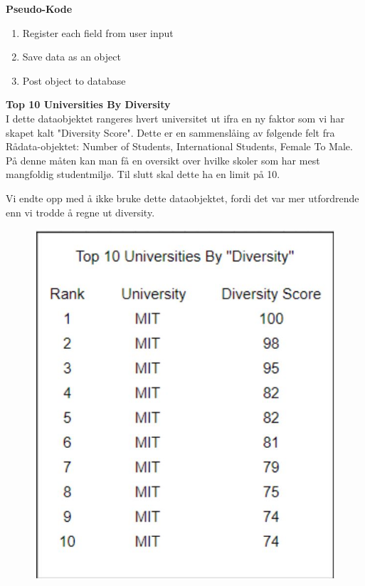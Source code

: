 \textbf{Pseudo-Kode}
\begin{enumerate}
  \item Register each field from user input
  \item Save data as an object
  \item Post object to database
\end{enumerate}

\textbf{Top 10 Universities By Diversity}\\
I dette dataobjektet rangeres hvert universitet ut ifra en ny faktor som vi har skapet kalt "Diversity Score". Dette er en sammenslåing av følgende felt fra Rådata-objektet: Number of Students, International Students, Female To Male. På denne måten kan man få en oversikt over hvilke skoler som har mest mangfoldig studentmiljø. Til slutt skal dette ha en limit på 10.

Vi endte opp med å ikke bruke dette dataobjektet, fordi det var mer utfordrende enn vi trodde å regne ut diversity.

\FigureCounter
\begin{figure}[H]
  \includegraphics[scale=0.5]{images/milepael4/topTenUnis.JPG}
\end{figure}

